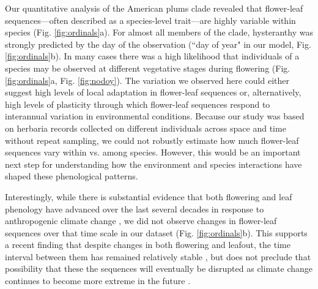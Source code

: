 \documentclass{article}[12pt]
\begin{document}
{Our quantitative analysis of the American plums clade revealed that flower-leaf sequences---often described as a species-level trait---are highly variable within species (Fig. \ref{fig:ordinals}a). For almost all members of the clade, hysteranthy was strongly predicted by the day of the observation (``day of year" in our model, Fig. \ref{fig:ordinals}b). In many cases there was a high likelihood that individuals of a species may be observed at different vegetative stages during flowering (Fig. \ref{fig:ordinals}a, Fig. \ref{fig:nodoy}). %
The variation we observed here could either suggest high levels of local adaptation in flower-leaf sequences or, alternatively, high levels of plasticity through which flower-leaf sequences respond to interannual variation in environmental conditions. Because our study was based on herbaria records collected on different individuals across space and time without repeat sampling, we could not robustly estimate how much flower-leaf sequences vary within vs. among species. However, this would be an important next step for understanding how the environment and species interactions have shaped these phenological patterns.

Interestingly, while there is substantial evidence that both flowering and leaf phenology have advanced over the last several decades in response to anthropogenic climate change \citep{Menzel2006,Cleland2007,Augspurger:2020aa}, we did not observe changes in flower-leaf sequences over that time scale in our dataset (Fig. \ref{fig:ordinals}b). This supports a recent finding that despite changes in both flowering and leafout, the time interval between them has remained relatively stable \citep{Guo:2023wb}, but does not preclude that possibility that these the sequences will eventually be disrupted as climate change continues to become more extreme in the future \citep{Buonaiuto_2021}.

}
\end{document}
